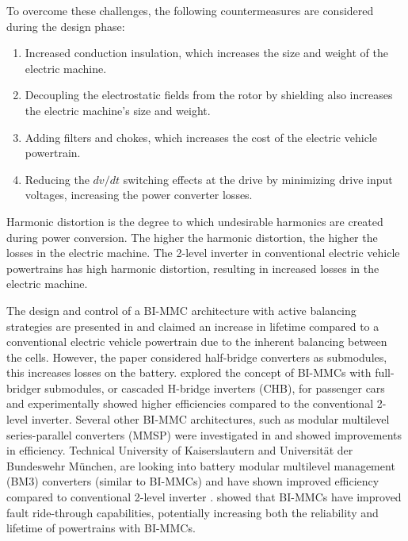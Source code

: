 \documentclass{article}
\begin{document}
To overcome these challenges, the following countermeasures are considered during the design phase:
\begin{enumerate}
    \item Increased conduction insulation, which increases the size and weight of the electric machine.
    \item Decoupling the electrostatic fields from the rotor by shielding also increases the electric machine's size and weight.
    \item Adding filters and chokes, which increases the cost of the electric vehicle powertrain.
    \item Reducing the $dv/dt$ switching effects at the drive by minimizing drive input voltages, increasing the power converter losses. 
\end{enumerate}
Harmonic distortion is the degree to which undesirable harmonics are created during power conversion. The higher the harmonic distortion, the higher the losses in the electric machine. The 2-level inverter in conventional electric vehicle powertrains has high harmonic distortion, resulting in increased losses in the electric machine. 

The design and control of a BI-MMC architecture with active balancing strategies are presented in \cite{quraan2015design} and claimed an increase in lifetime compared to a conventional electric vehicle powertrain due to the inherent balancing between the cells. However, the paper considered half-bridge converters as submodules, this increases losses on the battery.
\cite{josefsson2015investigation} explored the concept of BI-MMCs with full-bridger submodules, or cascaded H-bridge inverters (CHB), for passenger cars and experimentally showed higher efficiencies compared to the conventional 2-level inverter. Several other BI-MMC architectures, such as modular multilevel series-parallel converters (MMSP) were investigated in \cite{korte2017efficiency,kersten2021modular} and showed improvements in efficiency. Technical University of Kaiserslautern and Universität der Bundeswehr München, are looking into battery modular multilevel management (BM3) converters (similar to BI-MMCs) and have shown improved efficiency compared to conventional 2-level inverter \cite{kuder2020battery}. \cite{ma2018analysis} showed that BI-MMCs have improved fault ride-through capabilities, potentially increasing both the reliability and lifetime of powertrains with BI-MMCs.
\end{document}
